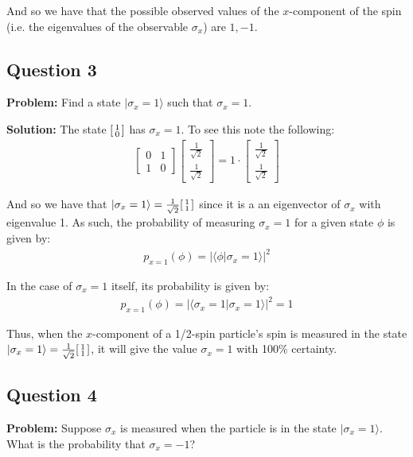 \documentclass{article}
\newcommand{\icol}[1]{%
  \begin{bsmallmatrix}#1\end{bsmallmatrix}%
}
\begin{document}
And so we have that the possible observed values of the $x$-component of the spin (i.e. the eigenvalues of the observable $\sigma_x$) are $1,-1$.

\subsection*{Question 3}
\noindent\textbf{Problem:} Find a state $|\sigma_x=1\rangle$ such that $\sigma_x=1$.
\bigskip

\noindent\textbf{Solution:} The state $\icol{1\\0}$ has $\sigma_x=1$. To see this note the following:
\begin{align*}
    \begin{bmatrix}
        0&1\\1&0
    \end{bmatrix}\begin{bmatrix}
        \frac{1}{\sqrt{2}}\\\frac{1}{\sqrt{2}}
    \end{bmatrix}=1\cdot\begin{bmatrix}
        \frac{1}{\sqrt{2}}\\\frac{1}{\sqrt{2}}
    \end{bmatrix}
\end{align*} 

And so we have that $|\sigma_x=1\rangle=\frac{1}{\sqrt{2}}\icol{1\\1}$ since it is a an eigenvector of $\sigma_x$ with eigenvalue 1. As such, the probability of measuring $\sigma_x=1$ for a given state $\phi$ is given by:
\begin{align*}
    p_{x=1}(\phi)=\left|\langle\phi|\sigma_x=1\rangle\right|^2
\end{align*}

In the case of $\sigma_x=1$ itself, its probability is given by:
\begin{align*}
    p_{x=1}(\phi)=\left|\langle\sigma_x=1|\sigma_x=1\rangle\right|^2=1
\end{align*}

Thus, when the $x$-component of a 1/2-spin particle's spin is measured in the state $|\sigma_x=1\rangle=\frac{1}{\sqrt{2}}\icol{1\\1}$, it will give the value $\sigma_x=1$ with 100\% certainty.

\subsection*{Question 4}
\noindent\textbf{Problem:} Suppose $\sigma_x$ is measured when the particle is in the state $|\sigma_x=1\rangle$. What is the probability that $\sigma_x=-1$?
\bigskip
\end{document}
